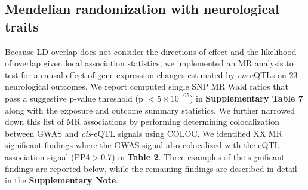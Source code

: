 {{\subsection{Mendelian randomization with neurological traits}
Because LD overlap does not consider the directions of effect and the likelihood of overlap given local association statistics, we implemented an MR analysis to test for a causal effect of gene expression changes estimated by \emph{cis}-eQTLs on 23 neurological outcomes. We report computed single SNP MR Wald ratios that pass a suggestive p-value threshold (p $< 5 \times 10^{-05}$) in \textbf{Supplementary Table 7} along with the exposure and outcome summary statistics. We further narrowed down this list of MR associations by performing determining colocalization between GWAS and \emph{cis}-eQTL signals using COLOC\cite{BayesianTestColocalisation}. We identified XX MR significant findings where the GWAS signal also colocalized with the eQTL association signal (PP4$>$0.7) in \textbf{Table 2}. Three examples of the significant findings are reported below, while the remaining findings are described in detail in the \textbf{Supplementary Note}. 

}}
